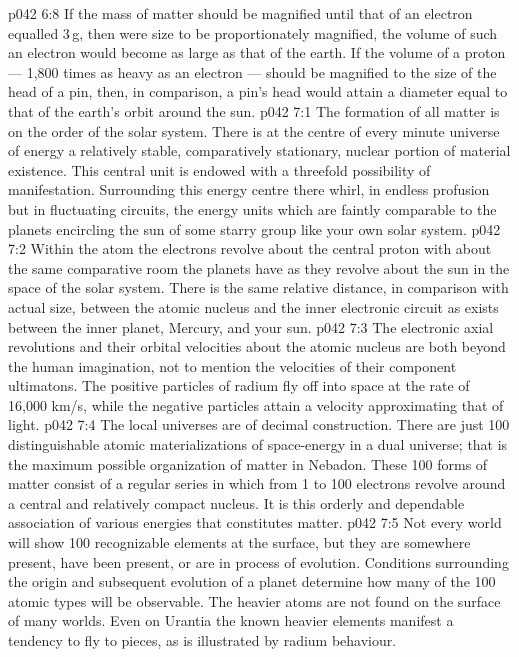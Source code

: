 \vs p042 6:8 \pc If the mass of matter should be magnified until that of an electron equalled 3\,g, then were size to be proportionately magnified, the volume of such an electron would become as large as that of the earth. If the volume of a proton --- 1,800 times as heavy as an electron --- should be magnified to the size of the head of a pin, then, in comparison, a pin’s head would attain a diameter equal to that of the earth’s orbit around the sun.
\vs p042 7:1 The formation of all matter is on the order of the solar system. There is at the centre of every minute universe of energy a relatively stable, comparatively stationary, nuclear portion of material existence. This central unit is endowed with a threefold possibility of manifestation. Surrounding this energy centre there whirl, in endless profusion but in fluctuating circuits, the energy units which are faintly comparable to the planets encircling the sun of some starry group like your own solar system.
\vs p042 7:2 \pc Within the atom the electrons revolve about the central proton with about the same comparative room the planets have as they revolve about the sun in the space of the solar system. There is the same relative distance, in comparison with actual size, between the atomic nucleus and the inner electronic circuit as exists between the inner planet, Mercury, and your sun.
\vs p042 7:3 The electronic axial revolutions and their orbital velocities about the atomic nucleus are both beyond the human imagination, not to mention the velocities of their component ultimatons. The positive particles of radium fly off into space at the rate of 16,000 km/s, while the negative particles attain a velocity approximating that of light.
\vs p042 7:4 \pc The local universes are of decimal construction. There are just 100 distinguishable atomic materializations of space\hyp{}energy in a dual universe; that is the maximum possible organization of matter in Nebadon. These 100 forms of matter consist of a regular series in which from 1 to 100 electrons revolve around a central and relatively compact nucleus. It is this orderly and dependable association of various energies that constitutes matter.
\vs p042 7:5 Not every world will show 100 recognizable elements at the surface, but they are somewhere present, have been present, or are in process of evolution. Conditions surrounding the origin and subsequent evolution of a planet determine how many of the 100 atomic types will be observable. The heavier atoms are not found on the surface of many worlds. Even on Urantia the known heavier elements manifest a tendency to fly to pieces, as is illustrated by radium behaviour.
